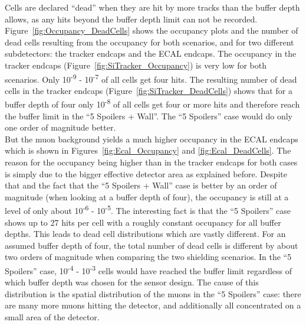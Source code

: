\newpage
Cells are declared ``dead'' when they are hit by more tracks than the buffer depth allows, as any hits beyond the buffer depth limit can not be recorded.
Figure~\ref{fig:Occupancy_DeadCells} shows the occupancy plots and the number of dead cells resulting from the occupancy for both scenarios, and for two different subdetectors: the tracker endcaps and the ECAL endcaps. 
The occupancy in the tracker endcaps (Figure~\ref{fig:SiTracker_Occupancy}) is very low for both scenarios.
Only 10\textsuperscript{-9} - 10\textsuperscript{-7} of all cells get four hits.
The resulting number of dead cells in the tracker endcaps (Figure~\ref{fig:SiTracker_DeadCells}) shows that for a buffer depth of four only 10\textsuperscript{-8} of all cells get four or more hits and therefore reach the buffer limit in the ``5 Spoilers + Wall''.
The ``5 Spoilers'' case would do only one order of magnitude better.\\
But the muon background yields a much higher occupancy in the ECAL endcaps which is shown in Figures~\ref{fig:Ecal_Occupancy} and \ref{fig:Ecal_DeadCells}.
The reason for the occupancy being higher than in the tracker endcaps for both cases is simply due to the bigger effective detector area as explained before.
Despite that and the fact that the ``5 Spoilers + Wall'' case is better by an order of magnitude (when looking at a buffer depth of four), the occupancy is still at a level of only about 10\textsuperscript{-6} - 10\textsuperscript{-5}.
The interesting fact is that the ``5 Spoilers'' case shows up to 27 hits per cell with a roughly constant occupancy for all buffer depths.
This leads to dead cell distributions which are vastly different.
For an assumed buffer depth of four, the total number of dead cells is different by about two orders of magnitude when comparing the two shielding scenarios.
In the ``5 Spoilers'' case, 10\textsuperscript{-4} - 10\textsuperscript{-3} cells would have reached the buffer limit regardless of which buffer depth was chosen for the sensor design.
The cause of this distribution is the spatial distribution of the muons in the ``5 Spoilers'' case: there are many more muons hitting the detector, and additionally all concentrated on a small area of the detector.

